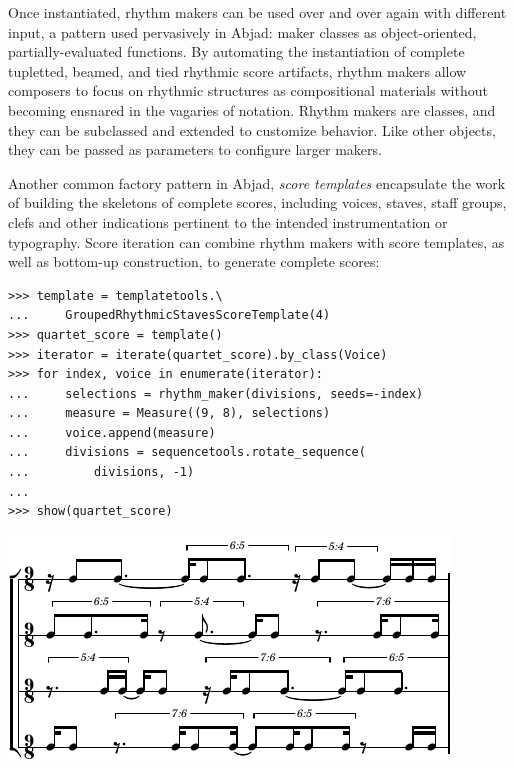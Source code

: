 \documentclass{article}
\begin{document}
\noindent Once instantiated, rhythm makers can be used over and over again with
different input, a pattern used pervasively in Abjad: maker classes as
object-oriented, partially-evaluated functions. By automating the instantiation
of complete tupletted, beamed, and tied rhythmic score artifacts, rhythm makers
allow composers to focus on rhythmic structures as compositional materials
without becoming ensnared in the vagaries of notation. Rhythm makers are
classes, and they can be subclassed and extended to customize behavior. Like
other objects, they can be passed as parameters to configure larger makers.

Another common factory pattern in Abjad, \emph{score templates} encapsulate the
work of building the skeletons of complete scores, including voices, staves,
staff groups, clefs and other indications pertinent to the intended
instrumentation or typography. Score iteration can combine rhythm makers with
score templates, as well as bottom-up construction, to generate complete scores:

\begin{lstlisting}
>>> template = templatetools.\
...     GroupedRhythmicStavesScoreTemplate(4)
>>> quartet_score = template()
>>> iterator = iterate(quartet_score).by_class(Voice)
>>> for index, voice in enumerate(iterator):
...     selections = rhythm_maker(divisions, seeds=-index)
...     measure = Measure((9, 8), selections)
...     voice.append(measure)
...     divisions = sequencetools.rotate_sequence(
...         divisions, -1)
...
>>> show(quartet_score)
\end{lstlisting}
\includegraphics{assets/lilypond-4598fe78647d623cdf81100e0343874a.pdf}
\end{document}
